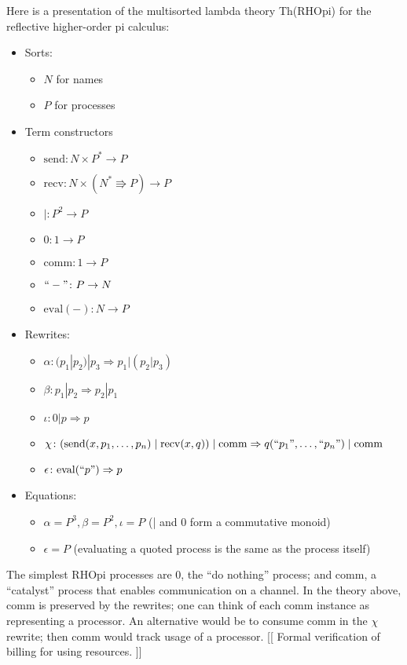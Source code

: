 \documentclass{article}
\newcommand{\maps}{\colon}
\newcommand{\send}{\mathrm{send}}
\newcommand{\recv}{\mathrm{recv}}
\newcommand{\comm}{\mathrm{comm}}
\renewcommand{\quote}[1]{``#1"}
\newcommand{\deref}[1]{\mathrm{eval}(#1)}
\begin{document}
Here is a presentation of the multisorted lambda theory Th(RHOpi) for the reflective higher-order pi calculus:
\begin{itemize}
  \item Sorts:
  \begin{itemize}
    \item $N$ for names
    \item $P$ for processes
  \end{itemize}
  \item Term constructors
  \begin{itemize}
    \item $\send\maps N \times P^* \to P$
    \item $\recv\maps N \times (N^* \Rrightarrow P) \to P$
    \item $|\maps P^2 \to P$
    \item $0\maps 1 \to P$
    \item $\comm\maps 1 \to P$
    \item $\quote{-}\maps P \to N$
    \item $\deref{-}\maps N \to P$
  \end{itemize}
  \item Rewrites:
  \begin{itemize}
    \item $\alpha\maps (p_1 | p_2) | p_3 \Rightarrow p_1 | (p_2 | p_3)$
    \item $\beta\maps p_1 | p_2 \Rightarrow p_2 | p_1$
    \item $\iota\maps 0 | p \Rightarrow p$
    \item $\chi\maps (\send(x, p_1, \ldots, p_n) \;|\; \recv(x, q)) \;|\; \comm \Rightarrow q(\quote{p_1}, \ldots, \quote{p_n}) \;|\; \comm$
    \item $\epsilon\maps \deref{\quote{p}} \Rightarrow p$
  \end{itemize}
  \item Equations:
  \begin{itemize}
    \item $\alpha = P^3, \beta = P^2, \iota = P$ (| and 0 form a commutative monoid)
    \item $\epsilon = P$ (evaluating a quoted process is the same as the process itself)
  \end{itemize}
\end{itemize}

The simplest RHOpi processes are 0, the ``do nothing'' process; and comm, a ``catalyst'' process that enables communication on a channel.  In the theory above, comm is preserved by the rewrites; one can think of each comm instance as representing a processor.  An alternative would be to consume comm in the $\chi$ rewrite; then comm would track usage of a processor.  [[ Formal verification of billing for using resources. ]]
\end{document}
